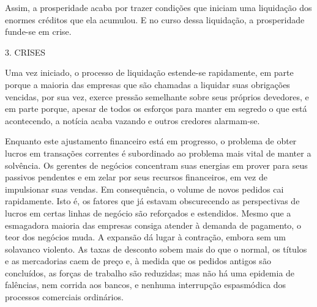 \documentclass[12pt]{article}
\begin{document}
Assim, a prosperidade acaba por trazer condições que iniciam uma liquidação dos enormes créditos que ela acumulou. E no curso dessa liquidação, a prosperidade funde-se em crise.

3. CRISES

Uma vez iniciado, o processo de liquidação estende-se rapidamente, em parte porque a maioria das empresas que são chamadas a liquidar suas obrigações vencidas, por sua vez, exerce pressão semelhante sobre seus próprios devedores, e em parte porque, apesar de todos os esforços para manter em segredo o que está acontecendo, a notícia acaba vazando e outros credores alarmam-se.

Enquanto este ajustamento financeiro está em progresso, o problema de obter lucros em transações correntes é subordinado ao problema mais vital de manter a solvência. Os gerentes de negócios concentram suas energias em prover para seus passivos pendentes e em zelar por seus recursos financeiros, em vez de impulsionar suas vendas. Em consequência, o volume de novos pedidos cai rapidamente. Isto é, os fatores que já estavam obscurecendo as perspectivas de lucros em certas linhas de negócio são reforçados e estendidos. Mesmo que a esmagadora maioria das empresas consiga atender à demanda de pagamento, o teor dos negócios muda. A expansão dá lugar à contração, embora sem um solavanco violento. As taxas de desconto sobem mais do que o normal, os títulos e as mercadorias caem de preço e, à medida que os pedidos antigos são concluídos, as forças de trabalho são reduzidas; mas não há uma epidemia de falências, nem corrida aos bancos, e nenhuma interrupção espasmódica dos processos comerciais ordinários.
\end{document}
